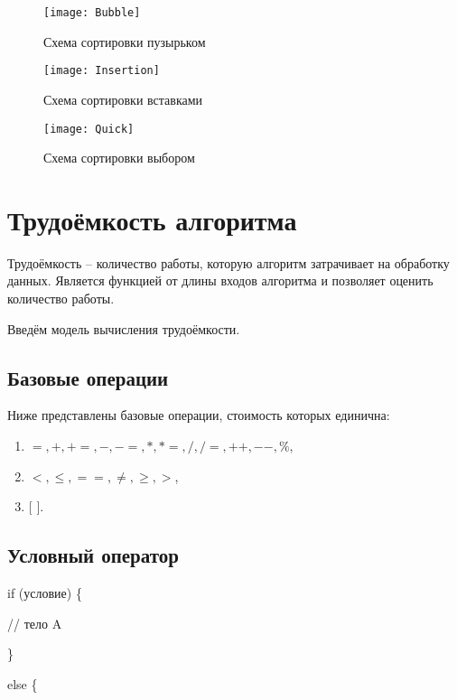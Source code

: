 \documentclass[utf8x, 12pt]{G7-32}
\begin{document}
    \begin{figure}[!htbp]
        \centering
        \texttt{[image: Bubble]}
        \caption{Схема сортировки пузырьком}
        \label{schema:num_1}
    \end{figure}

    \begin{figure}[!htbp]
        \centering
        \texttt{[image: Insertion]}
        \caption{Схема сортировки вставками}
        \label{schema:num_2}
    \end{figure}

    \begin{figure}[!htbp]
        \centering
        \texttt{[image: Quick]}
        \caption{Схема сортировки выбором}
        \label{schema:num_3}
    \end{figure}

\newpage
 \section{Трудоёмкость алгоритма}
        Трудоёмкость -- количество работы, которую алгоритм затрачивает на обработку данных.
        Является функцией от длины входов алгоритма и позволяет оценить количество работы.

        Введём модель вычисления трудоёмкости.

        \subsection{Базовые операции}
            Ниже представлены базовые операции, стоимость которых единична:
            \begin{enumerate}
                \item $ =, +, +=, -, -=, *, *=,  /, /=, ++, --, \% $,
                \item $ <, \leqslant, ==, \neq, \geqslant , > $,
                \item $ [ $  $ ] $.
            \end{enumerate}
            
        \subsection{Условный оператор}
            if (условие) \{

                // тело A

            \}

            else \{
\end{document}
